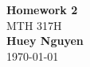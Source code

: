 \begin{titlepage}
    \begin{center}
    {\fontsize{40}{48}\selectfont \bfseries Homework 2} 
    \\\vspace{20pt}
    {\LARGE MTH 317H} \\
    \vspace{20pt}
    \textbf{Huey Nguyen}
    \vspace{8pt}
    \\\today
    \end{center}
\end{titlepage}